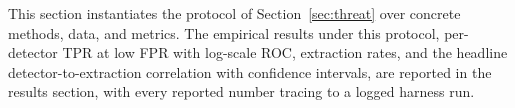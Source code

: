 This section instantiates the protocol of Section~\ref{sec:threat} over concrete methods,
data, and metrics. The empirical results
under this protocol, per-detector TPR at low FPR with log-scale ROC, extraction rates,
and the headline detector-to-extraction correlation with confidence
intervals, are reported in the results section, with every reported number tracing to a
logged harness run.
